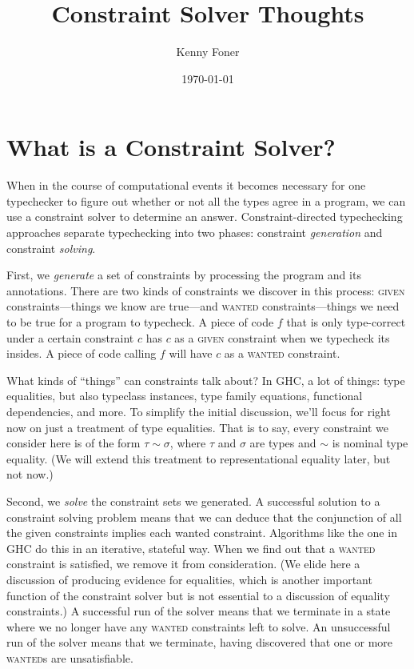 \documentclass[10pt, letterpaper, oneside]{article}
\title{Constraint Solver Thoughts}
\author{Kenny Foner}
\date{\today}
\begin{document}
\maketitle

\section{What is a Constraint Solver?}

When in the course of computational events it becomes necessary for one typechecker to figure out whether or not all the types agree in a program, we can use a constraint solver to determine an answer. Constraint-directed typechecking approaches separate typechecking into two phases: constraint \emph{generation} and constraint \emph{solving}.

First, we \emph{generate} a set of constraints by processing the program and its annotations. There are two kinds of constraints we discover in this process: \textsc{given} constraints---things we know are true---and \textsc{wanted} constraints---things we need to be true for a program to typecheck. A piece of code \(f\) that is only type-correct under a certain constraint \(c\) has \(c\) as a \textsc{given} constraint when we typecheck its insides. A piece of code calling \(f\) will have \(c\) as a \textsc{wanted} constraint.

What kinds of ``things'' can constraints talk about? In GHC, a lot of things: type equalities, but also typeclass instances, type family equations, functional dependencies, and more. To simplify the initial discussion, we'll focus for right now on just a treatment of type equalities. That is to say, every constraint we consider here is of the form \(\tau \sim \sigma\), where \(\tau\) and \(\sigma\) are types and \(\sim\) is nominal type equality. (We will extend this treatment to representational equality later, but not now.)

Second, we \emph{solve} the constraint sets we generated. A successful solution to a constraint solving problem means that we can deduce that the conjunction of all the given constraints implies each wanted constraint. Algorithms like the one in GHC do this in an iterative, stateful way. When we find out that a \textsc{wanted} constraint is satisfied, we remove it from consideration. (We elide here a discussion of producing evidence for equalities, which is another important function of the constraint solver but is not essential to a discussion of equality constraints.) A successful run of the solver means that we terminate in a state where we no longer have any \textsc{wanted} constraints left to solve. An unsuccessful run of the solver means that we terminate, having discovered that one or more {\textsc{wanted}}s are unsatisfiable.\\
\end{document}
